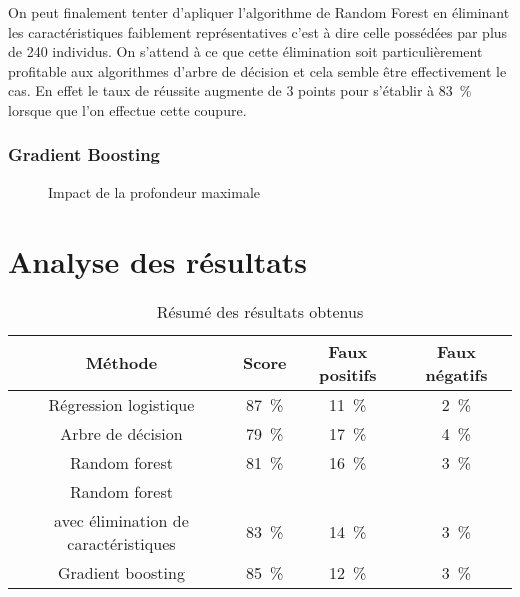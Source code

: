 \documentclass[11pt,a4paper]{article}
\begin{document}
			On peut finalement tenter d'apliquer l'algorithme de Random Forest en éliminant les caractéristiques faiblement représentatives c'est à dire celle possédées par plus de 240 individus. On s'attend à ce que cette élimination soit particulièrement profitable aux algorithmes d'arbre de décision et cela semble être effectivement le cas. En effet le taux de réussite augmente de 3 points pour s'établir à \SI{83}{\percent} lorsque que l'on effectue cette coupure.

		\subsubsection{Gradient Boosting}

			\begin{figure}
				\begin{center}
					\caption{Impact de la profondeur maximale}
					\label{rf_depth}
				\end{center}
			\end{figure}
\section{Analyse des résultats}

	\begin{table}
	\begin{center}
	\begin{tabular}{cccc}
		\toprule
		Méthode  &	Score  &	Faux positifs  &	Faux négatifs \\
		\midrule
		Régression logistique 	& \SI{87}{\percent} 	 &	\SI{11}{\percent}  	& \SI{2}{\percent} \\
		Arbre de décision & \SI{79}{\percent} & \SI{17}{\percent} & \SI{4}{\percent} \\
		Random forest & \SI{81}{\percent} & \SI{16}{\percent} & \SI{3}{\percent} \\
		Random forest \\ avec élimination de caractéristiques& \SI{83}{\percent} & \SI{14}{\percent} & \SI{3}{\percent} \\
		Gradient boosting & \SI{85}{\percent} & \SI{12}{\percent} & \SI{3}{\percent} \\
		\bottomrule
	\end{tabular}
	\caption{Résumé des résultats obtenus \label{table:results}}
	\end{center}
\end{table}
\end{document}
